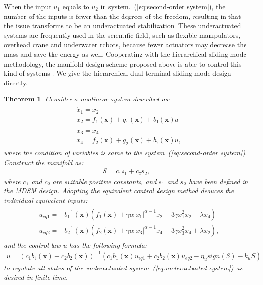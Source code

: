 \documentclass[3p]{elsarticle}
\theoremstyle{plain}
\newtheorem{mythm}{Theorem}
\theoremstyle{remark}
\begin{document}
When the input $u_1$ equals to $u_2$ in system.~(\ref{eq:second-order system}), the number of the inputs is fewer than the degrees of the freedom, resulting in that the issue transforms to be an underactuated stabilization. These underactuated systems are frequently used in the scientific field, such as flexible manipulators, overhead crane and underwater robots, because fewer actuators may decrease the mass and save the energy as well. Cooperating with the hierarchical sliding mode methodology, the manifold design scheme proposed above is able to control this kind of systems \cite{wang2004design}. We give the hierarchical dual terminal sliding mode design directly.
\begin{mythm}
Consider a nonlinear system described as:
\begin{align}
\begin{split}
&\dot x_1 = x_2\\
&\dot x_2 = f_1(\bm x) + g_1(\bm x)+b_1(\bm x)u\\
&\dot x_3 = x_4\\
&\dot x_4 = f_2(\bm x) + g_2(\bm x)+b_2(\bm x)u,\label{eq:underactuated system}
\end{split}
\end{align}
where the condition of variables is same to the system~(\ref{eq:second-order system}). Construct the manifold as:
\begin{align}
S = c_1s_1+c_2s_2,
\end{align}
where $c_1$ and $c_2$ are suitable positive constants, and $s_1$ and $s_2$ have been defined in the MDSM design. Adopting the equivalent control design method deduces the individual equivalent inputs:
\begin{align}
\begin{split}
&u_{eq1} = -b_1^{-1}(\bm x)(f_1(\bm x)+\gamma\alpha\vert x_1\vert^{\alpha-1}x_2+3\gamma x_1^2x_2-\lambda x_4)\\
&u_{eq2} = -b_2^{-1}(\bm x)(f_2(\bm x)+\gamma\alpha\vert x_3\vert^{\alpha-1}x_4+3\gamma x_3^2x_4+\lambda x_2),
\end{split}
\end{align}
and the control law $u$ has the following formula:
\begin{align}
u = (c_1b_1(\bm x)+c_2b_2(\bm x))^{-1}(c_1b_1(\bm x)u_{eq1}+c_2b_2(\bm x)u_{eq2}-\eta_u sign(S)-k_u S)\label{eq:underactuated input}
\end{align}
to regulate all states of the underactuated system~(\ref{eq:underactuated system}) as desired in finite time.
\end{mythm}
\end{document}
